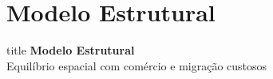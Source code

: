 
\section{Modelo Estrutural}

\begin{frame}[plain]
    \vfill
    \centering
    \begin{beamercolorbox}[sep=12pt,center,shadow=false,rounded=true]{title}
        {\Large\bfseries Modelo Estrutural}\\[6pt]
        {\normalsize Equilíbrio espacial com comércio e migração custosos}
    \end{beamercolorbox}
    \vfill
\end{frame}

